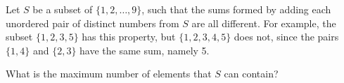 Let $S$ be a subset of $\{1, 2, \dots, 9\}$,  such that the sums formed by adding each unordered pair of distinct numbers from $S$ are all different.  For example, the subset $\{1, 2, 3, 5\}$ has this property, but $\{1, 2, 3, 4, 5\}$ does not, since the pairs $\{1, 4\}$ and $\{2, 3\}$ have the same sum, namely 5.

What is the maximum number of elements that $S$ can contain?